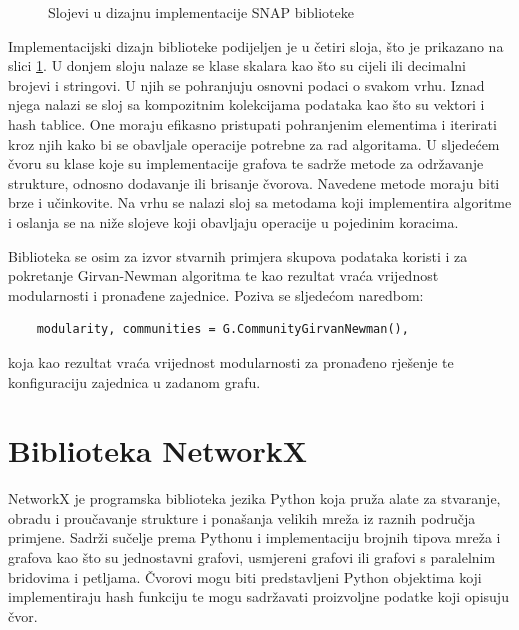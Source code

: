\begin{figure}
	\caption{Slojevi u dizajnu implementacije SNAP biblioteke \cite{leskovec2016snap}}
	\label{fig:SNAP_design}
\end{figure}

Implementacijski dizajn biblioteke podijeljen je u četiri sloja, što je prikazano na slici \ref{fig:SNAP_design}. U donjem sloju nalaze se klase skalara kao što su cijeli ili decimalni brojevi i stringovi. U njih se pohranjuju osnovni podaci o svakom vrhu. Iznad njega nalazi se sloj sa kompozitnim kolekcijama podataka kao što su vektori i hash tablice. One moraju efikasno pristupati pohranjenim elementima i iterirati kroz njih kako bi se obavljale operacije potrebne za rad algoritama. U sljedećem čvoru su klase koje su implementacije grafova te sadrže metode za održavanje strukture, odnosno dodavanje ili brisanje čvorova. Navedene metode moraju biti brze i učinkovite. Na vrhu se nalazi sloj sa metodama koji implementira algoritme i oslanja se na niže slojeve koji obavljaju operacije u pojedinim koracima.

Biblioteka se osim za izvor stvarnih primjera skupova podataka koristi i za pokretanje Girvan-Newman algoritma te kao rezultat vraća vrijednost modularnosti i pronađene zajednice. Poziva se sljedećom naredbom:
\begin{verbatim}
	modularity, communities = G.CommunityGirvanNewman(),
\end{verbatim} 
koja kao rezultat vraća vrijednost modularnosti za pronađeno rješenje te konfiguraciju zajednica u zadanom grafu.



\section{Biblioteka NetworkX}
NetworkX \cite{SciPyProceedings_11} je programska biblioteka jezika Python koja pruža alate za stvaranje, obradu i proučavanje strukture i ponašanja velikih mreža iz raznih područja primjene. Sadrži sučelje prema Pythonu i implementaciju brojnih tipova mreža i grafova kao što su jednostavni grafovi, usmjereni grafovi ili grafovi s paralelnim bridovima i petljama. Čvorovi mogu biti predstavljeni Python objektima koji implementiraju hash funkciju te mogu sadržavati proizvoljne podatke koji opisuju čvor.


